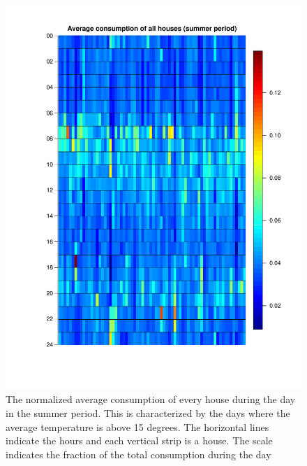 \begin{figure}
    \centering
    \includegraphics[width=\textwidth]{../../../figures/Heatmap_summer.pdf}
    \caption{The normalized average consumption of every house during the day in the summer period. This is characterized by the days where the average temperature is above 15 degrees. The horizontal lines indicate the hours and each vertical strip is a house. The scale indicates the fraction of the total consumption during the day}
    \label{fig: Hourcons_summer}
\end{figure}


